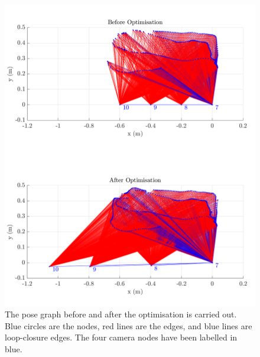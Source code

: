 \begin{figure}[ht]
\centering
\includegraphics[width=1\textwidth]{Images/graph_before_after_optimising.png}
\caption{\centering The pose graph before and after the optimisation is carried out. Blue circles are the nodes, red lines are the edges, and blue lines are loop-closure edges. The four camera nodes have been labelled in blue.}
\end{figure}